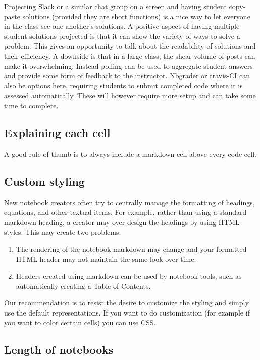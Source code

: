 \documentclass[]{book}
\begin{document}
Projecting Slack or a similar chat group on a screen and having student
copy-paste solutions (provided they are short functions) is a nice way
to let everyone in the class see one another's solutions. A positive
aspect of having multiple student solutions projected is that it can
show the variety of ways to solve a problem. This gives an opportunity
to talk about the readability of solutions and their efficiency. A
downside is that in a large class, the shear volume of posts can make it
overwhelming. Instead polling can be used to aggregate student answers
and provide some form of feedback to the instructor. Nbgrader or
travis-CI can also be options here, requiring students to submit
completed code where it is assessed automatically. These will however
require more setup and can take some time to complete.

\subsection{Explaining each cell}\label{explaining-each-cell}

A good rule of thumb is to always include a markdown cell above every
code cell.

\subsection{Custom styling}\label{custom-styling}

New notebook creators often try to centrally manage the formatting of
headings, equations, and other textual items. For example, rather than
using a standard markdown heading, a creator may over-design the
headings by using HTML styles. This may create two problems:

\begin{enumerate}
\def\labelenumi{\arabic{enumi}.}
\item
  The rendering of the notebook markdown may change and your formatted
  HTML header may not maintain the same look over time.
\item
  Headers created using markdown can be used by notebook tools, such as
  automatically creating a Table of Contents.
\end{enumerate}

Our recommendation is to resist the desire to customize the styling and
simply use the default representations. If you want to do customization
(for example if you want to color certain cells) you can use CSS.

\subsection{Length of notebooks}\label{length-of-notebooks}
\end{document}
